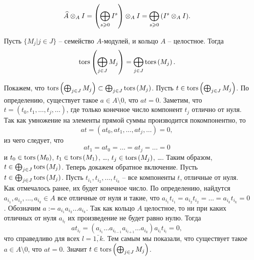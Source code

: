     \begin{equation*}
        \widehat{A} \otimes_A I = \left(\bigoplus_{s \geqslant 0}{I^s}\right) \otimes_A I = 
            \bigoplus_{s \geqslant 0}{\left(I^s \otimes_A I\right)}.
    \end{equation*}

    \begin{Proposal} \label{torsIdentity}
        Пусть $\{M_j | j \in J\}$ -- семейство $A$-модулей, и кольцо $A$ -- целостное. Тогда
        \begin{equation*}
            \textup{tors}\left(\bigoplus_{j \in J} M_j\right) = \bigoplus_{j \in J} \textup{tors}\left(M_j\right).
        \end{equation*}
    \end{Proposal}
    \begin{Proof}
        Покажем, что $\textup{tors}\left(\bigoplus_{j \in J} M_j\right) \subset \bigoplus_{j \in J} \textup{tors}\left(M_j\right)$. 
        Пусть \linebreak $t \in \textup{tors}\left(\bigoplus_{j \in J} M_j\right)$. По определению, существует такое 
        $a \in A \setminus 0$, что $at = 0$. Заметим, что $t = (t_0, t_1, \dots, t_j, \dots)$, где 
        только конечное число компонент $t_j$ отлично от нуля. Так как умножение на элементы прямой 
        суммы производится покомпонентно, то 
        \begin{equation*}
            at = (at_0, at_1, \dots, at_j, \dots) = 0,
        \end{equation*}
        из чего следует, что 
        \begin{equation*}
            at_1 = at_0 = \dots = at_j = \dots = 0
        \end{equation*}
        и $t_0 \in \textup{tors}\left(M_0\right)$, $t_1 \in \textup{tors}\left(M_1\right)$, \dots, $t_j \in \textup{tors}\left(M_j\right)$, \dots . 
        Таким образом,\linebreak $t \in \bigoplus_{j \in J} \textup{tors}\left(M_j\right)$. Теперь докажем обратное включение.
        Пусть $t \in \bigoplus_{j \in J} \textup{tors}\left(M_j\right)$. Пусть $t_{i_1}, t_{i_2}, \dots, t_{i_k}$ 
        -- все компоненты $t$, отличные от нуля. Как отмечалось ранее, их будет конечное число. По определению, 
        найдутся  $a_{i_1}, a_{i_2}, \dots, a_{i_k} \in A$ все отличные от нуля и такие, 
        что $a_{i_1}t_{i_1} = a_{i_2}t_{i_2} = \dots = a_{i_k}t_{i_k} = 0$. Обозначим 
        $a := a_{i_1}a_{i_2}\dots a_{i_k}$. Так как кольцо $A$ целостное, то ни при каких отличных от нуля 
        $a_{i_l}$ их произведение не будет равно нулю. Тогда
        \begin{equation*}
            at_{i_l} = (a_{i_1}\dots a_{i_{l-1}}a_{i_{l + 1}}\dots a_{i_k})a_{i_l}t_{i_l} = 0,
        \end{equation*}
        что справедливо для всех $l = \bar{1,k}$. Тем самым мы показали, 
        что существует такое $a \in A \setminus 0$, что $at = 0$. Значит 
        $t \in \textup{tors}\left(\bigoplus_{j \in J} M_j\right)$.
    \end{Proof}

